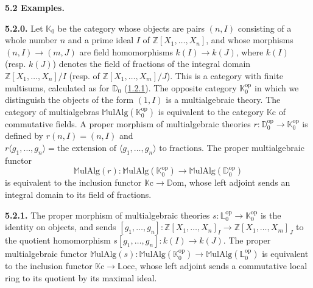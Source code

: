 \documentclass{article}
\newenvironment{rmenv}[1]
  {\phantomsection\par\medskip\noindent\textbf{#1.}\rmfamily}
  {\par\medskip}
\newcommand{\bb}[1]{{\mathbb{#1}}}
\newcommand{\op}{{\mathrm{op}}}
\newcommand{\MulAlg}{\mathbb{M}\mathrm{ulAlg}}
\newcommand{\Dom}{\mathbb{D}\mathrm{om}}
\newcommand{\Locc}{\mathbb{L}\mathrm{occ}}
\begin{document}
\begin{rmenv}{5.2 Examples}
\label{5.2}

  \begin{rmenv}{5.2.0}
  \label{5.2.0}
    Let $\bb{K}_0$ be the category whose objects are pairs $(n,I)$ consisting of a whole number $n$ and a prime ideal $I$ of $\bb{Z}[X_1,\ldots,X_n]$, and whose morphisms $(n,I)\to(m,J)$ are field homomorphisms $k(I)\to k(J)$, where $k(I)$ (resp. $k(J)$) denotes the field of fractions of the integral domain $\bb{Z}[X_1,\ldots,X_n]/I$ (resp. of $\bb{Z}[X_1,\ldots,X_m]/J$).
    This is a category with finite multisums, calculated as for $\bb{D}_0$ (\hyperref[1.2.1]{1.2.1}).
    The opposite category $\bb{K}_0^\op$ in which we distinguish the objects of the form $(1,I)$ is a multialgebraic theory.
    The category of multialgebras $\MulAlg(\bb{K}_0^\op)$ is equivalent to the category $\bb{K}\mathrm{c}$ of commutative fields.
    A proper morphism of multialgebraic theories $r\colon\bb{D}_0^\op\to\bb{K}_0^\op$ is defined by $r(n,I)=(n,I)$ and $r\langle g_1,\ldots,g_n\rangle=\mbox{the extension of $\langle g_1,\ldots,g_n\rangle$ to fractions}$.
    The proper multialgebraic functor
    \[
      \MulAlg(r)\colon \MulAlg(\bb{K}_0^\op) \to \MulAlg(\bb{D}_0^\op)
    \]
    is equivalent to the inclusion functor $\bb{K}\mathrm{c}\to\Dom$, whose left adjoint sends an integral domain to its field of fractions.
  \end{rmenv}

  \begin{rmenv}{5.2.1}
  \label{5.2.1}
    The proper morphism of multialgebraic theories $s\colon\bb{L}_0^\op\to\bb{K}_0^\op$ is the identity on objects, and sends $[g_1,\ldots,g_n]\colon\bb{Z}[X_1,\ldots,X_n]_I\to\bb{Z}[X_1,\ldots,X_m]_J$ to the quotient homomorphism $s[g_1,\ldots,g_n]\colon k(I)\to k(J)$.
    The proper multialgebraic functor $\MulAlg(s)\colon\MulAlg(\bb{K}_0^\op)\to\MulAlg(\bb{L}_0^\op)$ is equivalent to the inclusion functor $\bb{K}\mathrm{c}\to\Locc$, whose left adjoint sends a commutative local ring to its quotient by its maximal ideal.
  \end{rmenv}


\end{rmenv}
\end{document}
